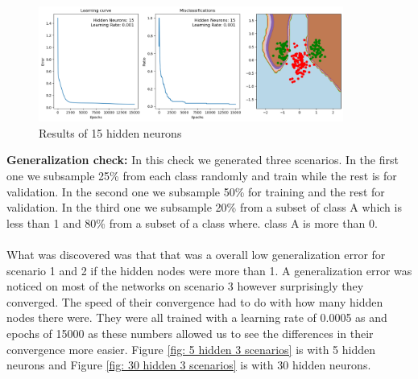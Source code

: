 \documentclass[a4paper]{article}
\begin{document}
\begin{figure}[htb]
    \centering
    \includegraphics[width=10cm]{Labs/Lab 1/Lab 1b/Figure/15HiddenLayer.png}
    \caption{Results of 15 hidden neurons}
    \label{fig:15Hidden}
\end{figure}
\textbf{Generalization check:}
In this check we generated three scenarios. In the first one we subsample 25\% from each class randomly and train while the rest is for validation. In the second one we subsample 50\% for training and the rest for validation. In the third one we subsample 20\% from a subset of class A which is less than 1 and 80\% from a subset of a class where. class A is more than 0. \\
\\ What was discovered was that that was a overall low generalization error for scenario 1 and 2 if the hidden nodes were more than 1. A generalization error was noticed on most of the networks on scenario 3 however surprisingly they converged. The speed of their convergence had to do with how many hidden nodes there were. They were all trained with a learning rate of 0.0005 as and epochs of 15000 as these numbers allowed us to see the differences in their convergence more easier. Figure \ref{fig: 5 hidden 3 scenarios} is with 5 hidden neurons and Figure \ref{fig: 30 hidden 3 scenarios} is with 30 hidden neurons. 
\end{document}
